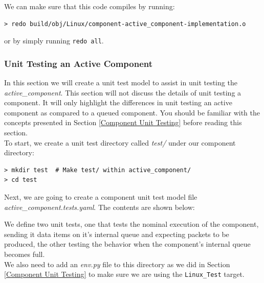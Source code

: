 We can make sure that this code compiles by running:

\vspace{5mm} %
\begin{verbatim}
> redo build/obj/Linux/component-active_component-implementation.o
\end{verbatim}
\vspace{5mm} %

or by simply running \texttt{redo all}. \\

\subsubsection{Unit Testing an Active Component}

In this section we will create a unit test model to assist in unit testing the \textit{active\_component}. This section will not discuss the details of unit testing a component. It will only highlight the differences in unit testing an active component as compared to a queued component. You should be familiar with the concepts presented in Section \ref{Component Unit Testing} before reading this section. \\

To start, we create a unit test directory called \textit{test/} under our component directory:

\vspace{5mm} %
\begin{verbatim}
> mkdir test  # Make test/ within active_component/
> cd test
\end{verbatim}
\vspace{5mm} %

Next, we are going to create a component unit test model file \textit{active\_component.tests.yaml}. The contents are shown below:


We define two unit tests, one that tests the nominal execution of the component, sending it data items on it's internal queue and expecting packets to be produced, the other testing the behavior when the component's internal queue becomes full. \\

We also need to add an \textit{env.py} file to this directory as we did in Section \ref{Component Unit Testing} to make sure we are using the \texttt{Linux\_Test} target. \\

